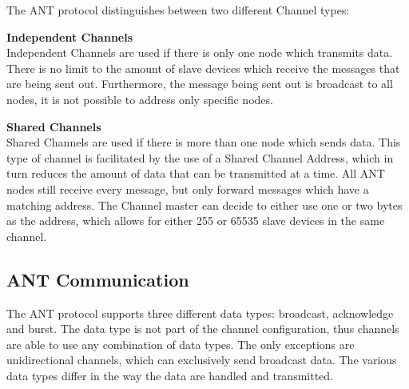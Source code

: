 The ANT protocol distinguishes between two different Channel types:
\begin{description}
\item{\textbf{Independent Channels}} \hfill \\ Independent Channels are used if there is only one node which transmits  data. There is no limit to the amount of slave devices which receive the messages that are being sent out. Furthermore, the message being sent out is broadcast to all nodes, it is not possible to address only specific nodes.
\item{\textbf{Shared Channels}} \hfill \\ Shared Channels are used if there is more than one node which sends data. This type of channel is facilitated by the use of a Shared Channel Address, which in turn reduces the amount of data that can be transmitted at a time. All ANT nodes still receive every message, but only forward messages which have a matching address. The Channel master can decide to either use one or two bytes as the address, which allows for either 255 or 65535 slave devices in the same channel. 
\end{description}

\subsection{ANT Communication}

The ANT protocol supports three different data types: broadcast, acknowledge and burst. The data type is not part of the channel configuration, thus channels are able to use any combination of data types. The only exceptions are unidirectional channels, which can exclusively send broadcast data. The various data types differ in the way the data are handled and transmitted.

